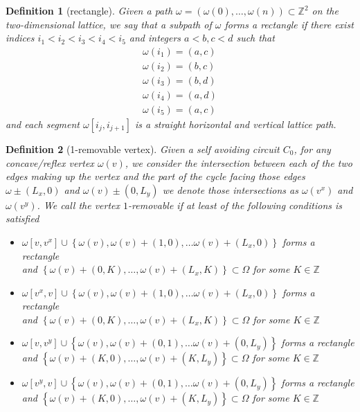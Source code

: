 \documentclass[12pt]{article}
\newtheorem{definition}{Definition}
\begin{document}
\begin{definition}[rectangle]
Given a path $\omega = (\omega(0), \ldots, \omega(n))\subset \mathbb{Z}^2$ on the two-dimensional lattice, we say that a subpath of $\omega$ \emph{forms a rectangle} if there exist indices $i_1<i_2<i_3<i_4<i_5$ and integers $a<b, c<d$ such that
\begin{align*}
\omega(i_1) = (a, c)\\
\omega(i_2) = (b, c)\\
\omega(i_3) = (b,d)\\
\omega(i_4) = (a, d)\\
\omega(i_5) = (a, c)
\end{align*}
and each segment $\omega[i_j, i_{j+1}]$ is a straight horizontal and vertical lattice path. 
\end{definition}



\begin{definition}[\label{oneRemovableVertex}1-removable vertex]
Given a self avoiding circuit $C_0$, for any concave/reflex vertex $\omega(v)$, we consider the intersection between each of the two edges making up the vertex and the part of the cycle facing those edges $\omega\pm (L_x, 0)$ and $\omega(v)\pm(0, L_y)$ we denote those intersections as $\omega(v^x)$ and $\omega(v^y)$.  We call the vertex $1$-removable if at least of the following conditions is satisfied
\begin{itemize}
\item $\omega[v, v^x]\cup \left\{\omega(v), \omega(v)+(1,0), \ldots \omega(v)+(L_x,0)\right\}$ forms a rectangle\\ and $\left\{\omega(v)+(0,K), \ldots, \omega(v)+(L_x, K)\right\}\subset \Omega$ for some $K\in \mathbb{Z}$
\item $\omega[v^x, v]\cup \left\{\omega(v), \omega(v)+(1,0), \ldots \omega(v)+(L_x,0)\right\}$ forms a rectangle\\ and $\left\{\omega(v)+(0,K), \ldots, \omega(v)+(L_x, K)\right\}\subset \Omega$ for some $K\in \mathbb{Z}$
\item $\omega[v, v^y]\cup \left\{\omega(v), \omega(v)+(0,1), \ldots \omega(v)+(0,L_y)\right\}$ forms a rectangle\\ and $\left\{\omega(v)+(K,0), \ldots, \omega(v)+(K,L_y)\right\}\subset \Omega$ for some $K\in \mathbb{Z}$
\item $\omega[v^y, v]\cup \left\{\omega(v), \omega(v)+(0,1), \ldots \omega(v)+(0,L_y)\right\}$ forms a rectangle\\
and $\left\{\omega(v)+(K,0), \ldots, \omega(v)+(K,L_y)\right\}\subset \Omega$ for some $K\in \mathbb{Z}$
\end{itemize}
\end{definition}
\end{document}
